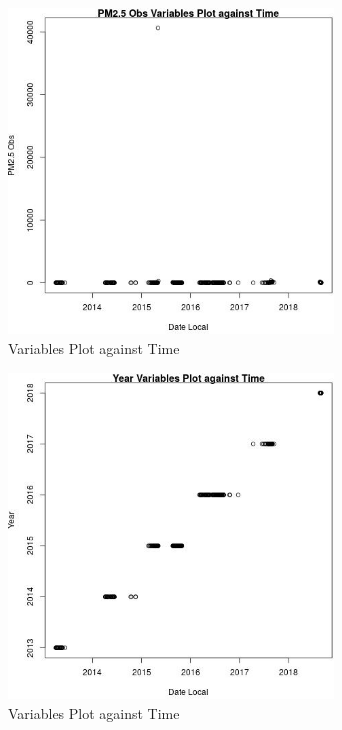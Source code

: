\begin{figure} 
\centering  
\includegraphics[width=0.77\textwidth]{Code_Outputs/Report_PM25_Step4_part_e_de_duplicated_aves_ML_input_PM25_ObsvDate_Local.jpg} 
\caption{\label{fig:Report_PM25_Step4_part_e_de_duplicated_aves_ML_inputPM25_ObsvDate_Local}Variables Plot against Time} 
\end{figure} 
 

\begin{figure} 
\centering  
\includegraphics[width=0.77\textwidth]{Code_Outputs/Report_PM25_Step4_part_e_de_duplicated_aves_ML_input_YearvDate_Local.jpg} 
\caption{\label{fig:Report_PM25_Step4_part_e_de_duplicated_aves_ML_inputYearvDate_Local}Variables Plot against Time} 
\end{figure} 
 


